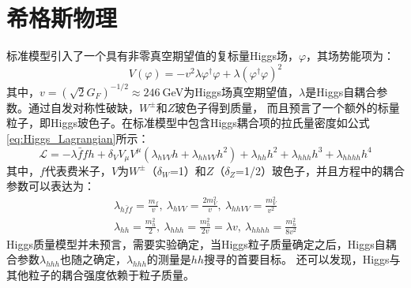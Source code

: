 \section{希格斯物理}
标准模型引入了一个具有非零真空期望值的复标量Higgs场，$\varphi$，其场势能项为：
\begin{equation}
 V(\varphi)=-v^2\lambda\varphi^{\dagger}\varphi+\lambda(\varphi^{\dagger}\varphi)^2
\end{equation}
其中，$v=(\sqrt{2}G_{F})^{-1/2}\approx246~$GeV为Higgs场真空期望值，$\lambda$是Higgs自耦合参数。通过自发对称性破缺，$W^{\pm}$和$Z$玻色子得到质量，
而且预言了一个额外的标量粒子，即Higgs玻色子。在标准模型中包含Higgs耦合项的拉氏量密度如公式\ref{eq:Higgs_Lagrangian}所示：
\begin{equation}
\label{eq:Higgs_Lagrangian}
\mathcal{L}=-\lambda\bar{f}fh+\delta_{V}V_{\mu}V^{\mu}(\lambda_{hVV}h+\lambda_{hhVV}h^2)+\lambda_{hh}h^2+\lambda_{hhh}h^3+\lambda_{hhhh}h^4
\end{equation}
其中，$f$代表费米子，$V$为$W^{\pm}$（$\delta_{W}$=1）和$Z$（$\delta_{Z}$=1/2）玻色子，并且方程中的耦合参数可以表达为：
\begin{equation}
 \begin{aligned}
 \lambda_{h\bar{f}f}=\frac{m_{f}}{v},~\lambda_{hVV}=\frac{2m_{V}^{2}}{v},~\lambda_{hhVV}=\frac{m_{V}^2}{v^2} \\
 \lambda_{hh}=\frac{m_{h}^2}{2},~\lambda_{hhh}=\frac{m_{h}^2}{2v}=\lambda v,~\lambda_{hhhh}=\frac{m_{h}^2}{8v^2}
 \end{aligned}
\end{equation}
Higgs质量模型并未预言，需要实验确定，当Higgs粒子质量确定之后，Higgs自耦合参数$\lambda_{hhh}$也随之确定，$\lambda_{hhh}$的测量是$hh$搜寻的首要目标。
还可以发现，Higgs与其他粒子的耦合强度依赖于粒子质量。

